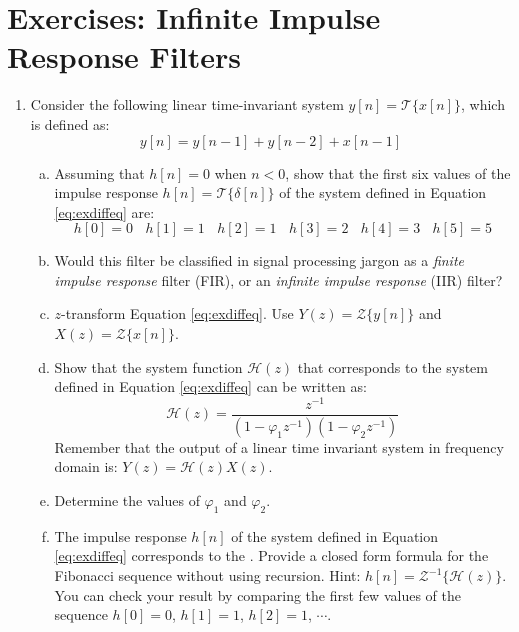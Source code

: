 \newpage
\section{Exercises: Infinite Impulse Response Filters}

\begin{enumerate}

\item Consider the following linear time-invariant system $y[n]=\mathcal{T}\{x[n]\}$, which is defined as:
\begin{equation}
y[n] = y[n-1] + y[n-2] + x[n-1]
\label{eq:exdiffeq}
\end{equation}

\begin{enumerate}[a)]

 \item Assuming that $h[n] = 0$ when $n < 0$, show that the first six values of the impulse response $h[n]=\mathcal{T}\{\delta[n]\}$ of the system defined in Equation \ref{eq:exdiffeq} are:
 \begin{equation*}
h[0] = 0~~~~h[1] = 1~~~~h[2] = 1~~~~h[3] = 2~~~~h[4] = 3~~~~h[5] = 5 
 \end{equation*}


\item Would this filter be classified in signal processing jargon as a
  \emph{finite impulse response} filter (FIR), or an \emph{infinite
  impulse response} (IIR) filter?


\item $z$-transform Equation \ref{eq:exdiffeq}. Use $Y(z)=\mathcal{Z}\{y[n]\}$ and $X(z)=\mathcal{Z}\{x[n]\}$.

\item Show that the system function $\mathcal{H}(z)$ that corresponds to the system defined in Equation \ref{eq:exdiffeq} can be written as:
\begin{equation*}
\mathcal{H}(z)=\frac{z^{-1}}{(1-\varphi_1 z^{-1})(1-\varphi_2 z^{-1})}    
\end{equation*}
Remember that the output of a linear time invariant system in frequency domain is: $Y(z)=\mathcal{H}(z)X(z)$.


\item Determine the values of $\varphi_1$ and $\varphi_2$.

\item The impulse response $h[n]$ of the system defined in Equation \ref{eq:exdiffeq} corresponds to the \emph{}. Provide a closed form formula for the Fibonacci sequence without using recursion. Hint: $h[n] = \mathcal{Z}^{-1}\{\mathcal{H}(z)\}$. You can check your result by comparing the first few values of the sequence $h[0]=0$, $h[1]=1$, $h[2]=1$, $\cdots$.



\end{enumerate}
\end{enumerate}
